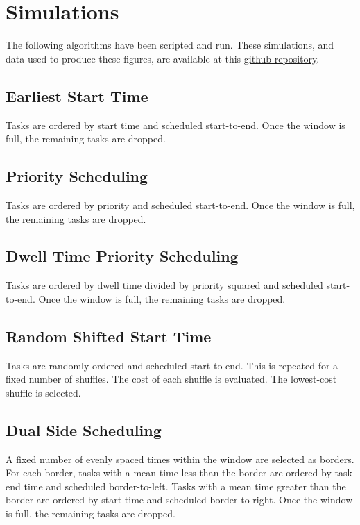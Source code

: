 \documentclass[journal,12pt,onecolumn,draftclsnofoot,]{IEEEtran}
\begin{document}
\section{Simulations}

The following algorithms have been scripted and run.
These simulations, and data used to produce these figures, are available at this \href{https://github.com/navh/radar-scheduling/tree/main/data}{github repository}.
\subsection{Earliest Start Time}

Tasks are ordered by start time and scheduled start-to-end.
Once the window is full, the remaining tasks are dropped.

\subsection{Priority Scheduling}

Tasks are ordered by priority and scheduled start-to-end.
Once the window is full, the remaining tasks are dropped.

\subsection{Dwell Time Priority Scheduling}

Tasks are ordered by dwell time divided by priority squared and scheduled start-to-end.
Once the window is full, the remaining tasks are dropped.

\subsection{Random Shifted Start Time}

Tasks are randomly ordered and scheduled start-to-end.
This is repeated for a fixed number of shuffles.
The cost of each shuffle is evaluated.
The lowest-cost shuffle is selected.

\subsection{Dual Side Scheduling}

A fixed number of evenly spaced times within the window are selected as borders.
For each border, tasks with a mean time less than the border are ordered by task end time and scheduled border-to-left.
Tasks with a mean time greater than the border are ordered by start time and scheduled border-to-right.
Once the window is full, the remaining tasks are dropped.
\end{document}
